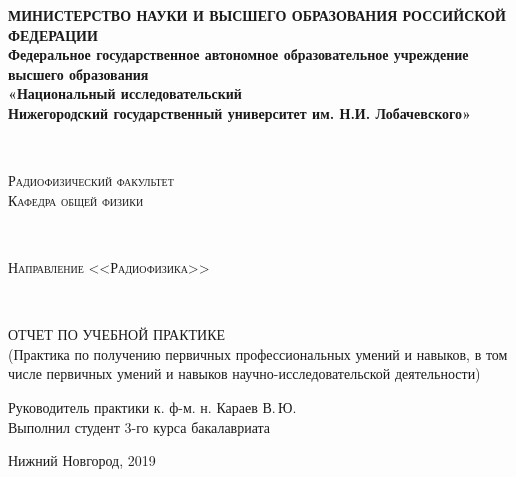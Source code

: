 \begin{titlepage}

\begin{center}

{\small\textbf{МИНИСТЕРСТВО НАУКИ И ВЫСШЕГО ОБРАЗОВАНИЯ РОССИЙСКОЙ ФЕДЕРАЦИИ \\ 
Федеральное государственное автономное образовательное учреждение\\
высшего образования\\
«Национальный исследовательский\\
Нижегородский государственный университет им. Н.И. Лобачевского»}}

~\

{\small\textsc{Радиофизический факультет}}\\
{\small\textsc {Кафедра общей физики}}
	
~\

{\small\textsc {Направление <<Радиофизика>>}}
	
~\

{\Large ОТЧЕТ ПО УЧЕБНОЙ ПРАКТИКЕ \\ (Практика по получению первичных профессиональных умений и навыков, в том числе первичных умений и навыков научно-исследовательской деятельности)}

\end{center}

\vfill
	
\begin{flushleft}
	Руководитель практики \hfill к. ф-м. н. Караев В.\,Ю. \\
	Выполнил студент 3-го курса бакалавриата \hfill \labauthors
\end{flushleft}
	
\vfill
	
\begin{center}
	Нижний Новгород, 2019
\end{center}

\end{titlepage}


